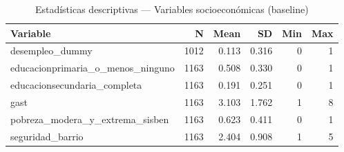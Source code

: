 \begin{table}[!h]
\centering
\caption{Estadísticas descriptivas — Variables socioeconómicas (baseline)}
\centering
\begin{tabular}[t]{lrrrrr}
\toprule
Variable & N & Mean & SD & Min & Max\\
\midrule
desempleo\_dummy & 1012 & 0.113 & 0.316 & 0 & 1\\
educacionprimaria\_o\_menos\_ninguno & 1163 & 0.508 & 0.330 & 0 & 1\\
educacionsecundaria\_completa & 1163 & 0.191 & 0.251 & 0 & 1\\
gast & 1163 & 3.103 & 1.762 & 1 & 8\\
pobreza\_modera\_y\_extrema\_sisben & 1163 & 0.623 & 0.411 & 0 & 1\\
\addlinespace
seguridad\_barrio & 1163 & 2.404 & 0.908 & 1 & 5\\
\bottomrule
\end{tabular}
\end{table}
